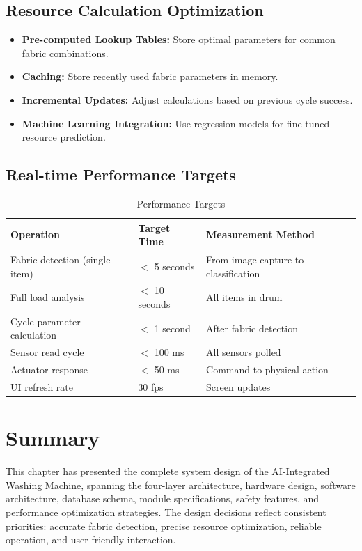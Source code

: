 \subsection{Resource Calculation Optimization}
\begin{itemize}
    \item \textbf{Pre-computed Lookup Tables:} Store optimal parameters for common fabric combinations.
    \item \textbf{Caching:} Store recently used fabric parameters in memory.
    \item \textbf{Incremental Updates:} Adjust calculations based on previous cycle success.
    \item \textbf{Machine Learning Integration:} Use regression models for fine-tuned resource prediction.
\end{itemize}

\subsection{Real-time Performance Targets}

\begin{table}[H]
\centering
\caption{Performance Targets}
\label{tab:perf}
\begin{tabular}{|l|l|l|}
\hline
\textbf{Operation} & \textbf{Target Time} & \textbf{Measurement Method} \\
\hline
Fabric detection (single item) & $<$ 5 seconds & From image capture to classification \\
\hline
Full load analysis & $<$ 10 seconds & All items in drum \\
\hline
Cycle parameter calculation & $<$ 1 second & After fabric detection \\
\hline
Sensor read cycle & $<$ 100 ms & All sensors polled \\
\hline
Actuator response & $<$ 50 ms & Command to physical action \\
\hline
UI refresh rate & 30 fps & Screen updates \\
\hline
\end{tabular}
\end{table}

\section{Summary}

This chapter has presented the complete system design of the AI-Integrated Washing Machine, spanning the four-layer architecture, hardware design, software architecture, database schema, module specifications, safety features, and performance optimization strategies. The design decisions reflect consistent priorities: accurate fabric detection, precise resource optimization, reliable operation, and user-friendly interaction.

